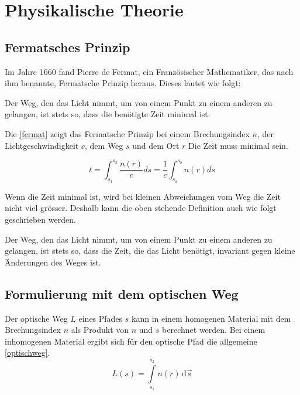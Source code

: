 \section{Physikalische Theorie}

\subsection{Fermatsches Prinzip}
Im Jahre 1660 fand Pierre de Fermat, 
ein Französischer Mathematiker, das 
nach ihm benannte, Fermatsche Prinzip heraus. 
Dieses lautet wie folgt:


Der Weg, den das Licht nimmt, 
um von einem Punkt zu einem anderen zu gelangen, 
ist stets so, dass die benötigte Zeit minimal ist.


Die \eqref{fermat} zeigt das Fermatsche Prinzip bei einem Brechungsindex $n$, 
der Lichtgeschwindigkeit $c$, dem Weg $s$ und dem Ort $r$ Die Zeit muss minimal sein.

\begin{equation}
	t= \int_{s_1}^{s_2} \frac{n(r)}{c} ds = \frac{1}{c} \int_{s_1}^{s_2} n(r) ds
	\label{fermat}
\end{equation}


Wenn die Zeit minimal ist, wird bei kleinen Abweichungen vom Weg die Zeit nicht viel grösser. 
Deshalb kann die oben stehende Definition auch wie folgt geschrieben werden.

Der Weg, den das Licht nimmt, 
um von einem Punkt zu einem anderen zu gelangen, 
ist stets so, dass die Zeit, die das Licht benötigt, 
invariant gegen kleine Änderungen des Weges ist.

\subsection{Formulierung mit dem optischen Weg}
Der optische Weg $L$  eines Pfades $s$ kann in einem homogenen Material 
mit dem Brechungsindex $n$ als Produkt von $n$ und $s$ berechnet werden.
Bei einem inhomogenen Material ergibt sich für den optische Pfad die allgemeine \eqref{optischweg}.
\begin{equation}
	L(s) = \int\limits_{s_1}^{s_2} n(r) \,\mathrm d\vec s 
	\label{optischweg}
\end{equation}

